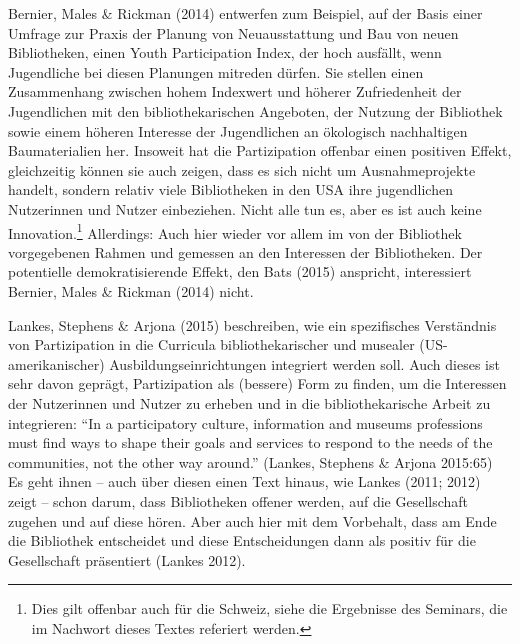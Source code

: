 \documentclass[a4paper,
fontsize=11pt,
oneside,
numbers=noperiodatend,
parskip=half-,
bibliography=totoc,
final
]{scrartcl}
\begin{document}
Bernier, Males \& Rickman (2014) entwerfen zum Beispiel, auf der Basis
einer Umfrage zur Praxis der Planung von Neuausstattung und Bau von
neuen Bibliotheken, einen Youth Participation Index, der hoch ausfällt,
wenn Jugendliche bei diesen Planungen mitreden dürfen. Sie stellen einen
Zusammenhang zwischen hohem Indexwert und höherer Zufriedenheit der
Jugendlichen mit den bibliothekarischen Angeboten, der Nutzung der
Bibliothek sowie einem höheren Interesse der Jugendlichen an ökologisch
nachhaltigen Baumaterialien her. Insoweit hat die Partizipation offenbar
einen positiven Effekt, gleichzeitig können sie auch zeigen, dass es
sich nicht um Ausnahmeprojekte handelt, sondern relativ viele
Bibliotheken in den USA ihre jugendlichen Nutzerinnen und Nutzer
einbeziehen. Nicht alle tun es, aber es ist auch keine
Innovation.\footnote{Dies gilt offenbar auch für die Schweiz, siehe die
  Ergebnisse des Seminars, die im Nachwort dieses Textes referiert
  werden.} Allerdings: Auch hier wieder vor allem im von der Bibliothek
vorgegebenen Rahmen und gemessen an den Interessen der Bibliotheken. Der
potentielle demokratisierende Effekt, den Bats (2015) anspricht,
interessiert Bernier, Males \& Rickman (2014) nicht.

Lankes, Stephens \& Arjona (2015) beschreiben, wie ein spezifisches
Verständnis von Partizipation in die Curricula bibliothekarischer und
musealer (US-amerikanischer) Ausbildungseinrichtungen integriert werden
soll. Auch dieses ist sehr davon geprägt, Partizipation als (bessere)
Form zu finden, um die Interessen der Nutzerinnen und Nutzer zu erheben
und in die bibliothekarische Arbeit zu integrieren: \enquote{In a
participatory culture, information and museums professions must find
ways to shape their goals and services to respond to the needs of the
communities, not the other way around.} (Lankes, Stephens \& Arjona
2015:65) Es geht ihnen -- auch über diesen einen Text hinaus, wie Lankes
(2011; 2012) zeigt -- schon darum, dass Bibliotheken offener werden, auf
die Gesellschaft zugehen und auf diese hören. Aber auch hier mit dem
Vorbehalt, dass am Ende die Bibliothek entscheidet und diese
Entscheidungen dann als positiv für die Gesellschaft präsentiert (Lankes
2012).
\end{document}
